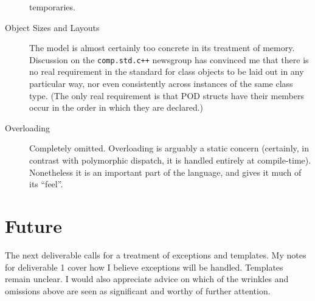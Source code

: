 \documentclass[11pt]{article}
\begin{document}
\begin{description}
  temporaries.
\item[Object Sizes and Layouts] The model is almost certainly too
  concrete in its treatment of memory.  Discussion on the
  \texttt{comp.std.c++} newsgroup has convinced me that there is no
  real requirement in the standard for class objects to be laid out in
  any particular way, nor even consistently across instances of the
  same class type.  (The only real requirement is that POD structs
  have their members occur in the order in which they are declared.)
\item[Overloading] Completely omitted. Overloading is arguably a
  static concern (certainly, in contrast with polymorphic dispatch, it
  is handled entirely at compile-time).  Nonetheless it is an
  important part of the language, and gives it much of its ``feel''.
\end{description}

\section{Future}

The next deliverable calls for a treatment of exceptions and
templates.  My notes for deliverable 1 cover how I believe exceptions
will be handled.  Templates remain unclear.  I would also appreciate
advice on which of the wrinkles and omissions above are seen as
significant and worthy of further attention.



\end{document}
